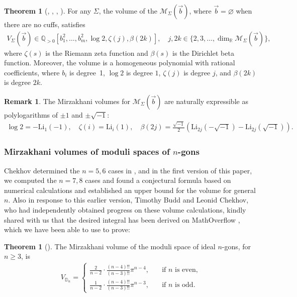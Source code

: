 \documentclass{amsart}
\newcommand{\DD}{\mathbb{D}}
\newcommand{\QQ}{\mathbb{Q}}
\theoremstyle{definition}
\newtheorem{theorem}[proposition]{Theorem}
\newtheorem{remark}[proposition]{Remark}
\begin{document}
\begin{theorem}[, , , ]
\label{thm:compositethm}
For any $\Sigma$, the volume of the $\mathcal{M}_\Sigma(\vec{b})$, where $\vec{b}=\varnothing$ when there are no cuffs, satisfies
\begin{align*}
V_\Sigma(\vec{b}) \in \QQ_{>0}[b_1^2,\ldots,b_m^2, \log2, \zeta(j),\beta(2k)],
\quad
j,2k \in \{2,3,\ldots,\dim_{\mathbb{R}}\mathcal{M}_{\Sigma}(\vec{b})\},
\end{align*}
where $\zeta(s)$ is the Riemann zeta function and $\beta(s)$ is the Dirichlet beta function. Moreover, the volume is a homogeneous polynomial with rational coefficients, where $b_i$ is degree~1, $\log 2$ is degree $1$, $\zeta(j)$ is degree $j$, and $\beta(2k)$ is degree $2k$.
\end{theorem}

\begin{remark}
\label{rmk:polylogs}
The Mirzakhani volumes  for $\mathcal{M}_\Sigma(\vec{b})$ are naturally expressible as polylogarithms of $\pm1$ and $\pm\sqrt{-1}$:
\begin{align*}
\log 2=-\text{Li}_1(-1),\quad
\zeta(i)=\text{Li}_i(1),\quad
\beta(2j)=\tfrac{\sqrt{-1}}{2}
\left(\text{Li}_{2j}(-\sqrt{-1})-\text{Li}_{2j}(\sqrt{-1})\right).
\end{align*}

\end{remark}






\subsubsection{Mirzakhani volumes of moduli spaces of $n$-gons}

Chekhov determined the $n=5,6$ cases in \cite[6.2.1 and 6.2.2]{chekhov2024}, and in the first version of this paper, we computed the $n=7,8$ cases and found a conjectural formula based on numerical calculations and established an upper bound for the volume for general $n$. Also in response to this earlier version, Timothy Budd and Leonid Chekhov, who had independently obtained progress on these volume calculations, kindly shared with us that the desired integral has been derived on MathOverflow \cite{MO402985}, which we have been able to use to prove:

\begin{theorem}[]
\label{thm:ngonvol-intro}
The Mirzakhani volume of the moduli space of ideal $n$-gons, for $n\geqslant 3$, is
\begin{align*}
V_{\DD_n} = \left\{
\begin{array}{rl}
\frac{2}{n-2}\cdot\frac{(n-4)!!}{(n-3)!!}\pi^{n-4},
&\quad\text{if }n\text{ is even,}
\\[0.25em]
  \frac{1}{n-2}\cdot\frac{(n-4)!!}{(n-3)!!}\pi^{n-3},
&\quad\text{if }n\text{ is odd.}
\end{array}
\right.    
\end{align*}    
\end{theorem}
\end{document}
